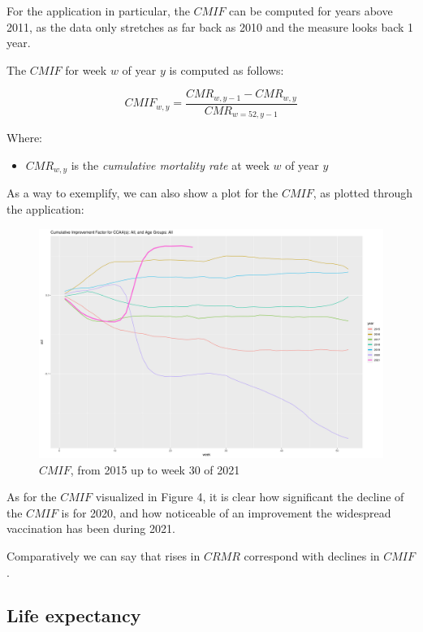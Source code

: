 \documentclass[
  a4paper]{article}
\providecommand{\tightlist}{%
  \setlength{\itemsep}{0pt}\setlength{\parskip}{0pt}}
\begin{document}
For the application in particular, the \(CMIF\) can be computed for
years above 2011, as the data only stretches as far back as 2010 and the
measure looks back 1 year.

The \(CMIF\) for week \(w\) of year \(y\) is computed as follows:

\[CMIF_{w, y} = \frac{CMR_{w, y-1} - CMR_{w, y}}{CMR_{w=52, y-1}}\]

Where:

\begin{itemize}
\tightlist
\item
  \(CMR_{w, y}\) is the \emph{cumulative mortality rate} at week \(w\)
  of year \(y\)
\end{itemize}

\newpage

As a way to exemplify, we can also show a plot for the \(CMIF\), as
plotted through the application:

\begin{figure}
\centering
\includegraphics{./images/cmif.png}
\caption{\(CMIF\), from 2015 up to week 30 of 2021}
\end{figure}

As for the \(CMIF\) visualized in Figure 4, it is clear how significant
the decline of the \(CMIF\) is for 2020, and how noticeable of an
improvement the widespread vaccination has been during 2021.

Comparatively we can say that rises in \(CRMR\) correspond with declines
in \(CMIF\).

\hypertarget{LE}{%
\subsection{Life expectancy}\label{LE}}
\end{document}
